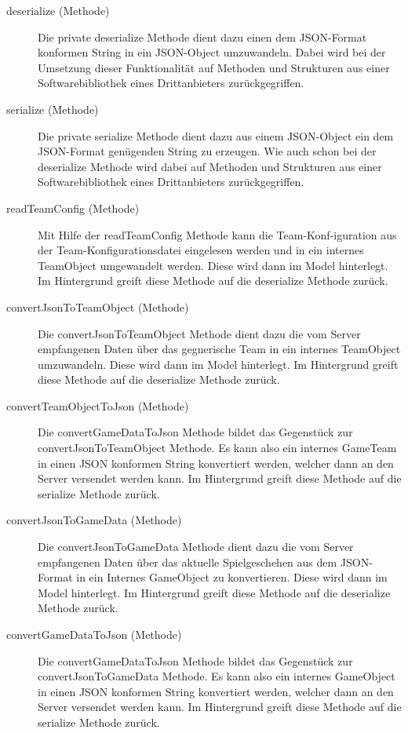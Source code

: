 		\begin{description}
                
        	\item[deserialize (Methode)]
        	Die private deserialize Methode dient dazu einen dem JSON-Format konformen String in ein JSON-Object umzuwandeln. Dabei wird bei der Umsetzung dieser Funktionalität auf Methoden und Strukturen aus einer Softwarebibliothek eines Drittanbieters zurückgegriffen. 
        	
        	\item[serialize (Methode)]
        	Die private serialize Methode dient dazu aus einem JSON-Object ein dem JSON-Format genügenden String zu erzeugen. Wie auch schon bei der deserialize Methode wird dabei auf Methoden und Strukturen aus einer Softwarebibliothek eines Drittanbieters zurückgegriffen. 
        	
        	\item[readTeamConfig (Methode)]
        	Mit Hilfe der readTeamConfig Methode kann die Team-Konf-iguration aus der Team-Konfigurationsdatei eingelesen werden und in ein internes TeamObject umgewandelt werden. Diese wird dann im Model hinterlegt. Im Hintergrund greift diese Methode auf die deserialize Methode zurück.
        	
        	\item[convertJsonToTeamObject (Methode)]
        	Die convertJsonToTeamObject Methode dient dazu die vom Server empfangenen Daten über das gegnerische Team in ein internes TeamObject umzuwandeln. Diese wird dann im Model hinterlegt. Im Hintergrund greift diese Methode auf die deserialize Methode zurück. 
        	\item[convertTeamObjectToJson (Methode)]
        	Die convertGameDataToJson Methode bildet das Gegenstück zur convertJsonToTeamObject Methode. Es kann also ein internes GameTeam in einen JSON konformen String konvertiert werden, welcher dann an den Server versendet werden kann. Im Hintergrund greift diese Methode auf die serialize Methode zurück.
        	
        	\item[convertJsonToGameData (Methode)]
        	Die convertJsonToGameData Methode dient dazu die vom Server empfangenen Daten über das aktuelle Spielgeschehen aus dem JSON-Format in ein Internes GameObject zu konvertieren. Diese wird dann im Model hinterlegt. Im Hintergrund greift diese Methode auf die deserialize Methode zurück. 

			\item[convertGameDataToJson (Methode)]
        	Die convertGameDataToJson Methode bildet das Gegenstück zur convertJsonToGameData Methode. Es kann also ein internes GameObject in einen JSON konformen String konvertiert werden, welcher dann an den Server versendet werden kann. Im Hintergrund greift diese Methode auf die serialize Methode zurück. 
        	
    	\end{description}
    	

